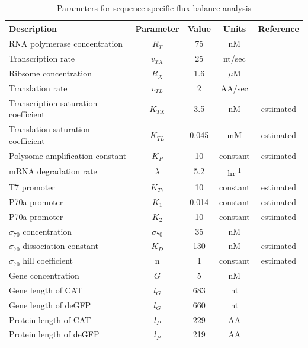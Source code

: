 \documentclass[journal=asbcd6,manuscript=article]{achemso}
\begin{document}
\begin{table}[!]
\centering
    \caption{Parameters for sequence specific flux balance analysis}
    \renewcommand{\arraystretch}{1}
    \begin{tabular}{lcccc} \toprule
        \textbf{Description} & \textbf{Parameter} & \textbf{Value} & \textbf{Units} & \textbf{Reference} \\ \toprule
        RNA polymerase concentration & $R_{T}$ & 75 & nM & \cite{Garamella:2016aa} \\
        Transcription rate & $v_{TX}$ & 25 & nt/sec & \cite{Garamella:2016aa} \\
        Ribsome concentration & $R_{X}$ & 1.6 & $\mu$M & \cite{Garamella:2016aa, 2005_underwood_biotech} \\
        Translation rate & $v_{TL}$ & 2 & AA/sec & \cite{Garamella:2016aa, 2005_underwood_biotech} \\
        Transcription saturation coefficient & $K_{TX}$ & 3.5 & nM & estimated \\
        Translation saturation coefficient & $K_{TL}$ & 0.045 & mM & estimated \\
        Polysome amplification constant & $K_{P}$ & 10 & constant & estimated \\
        mRNA degradation rate & $\lambda$ & 5.2 & hr\textsuperscript{-1} & \cite{Garamella:2016aa} \\
        T7 promoter & $K_{T7}$ & 10 & constant & estimated \\
        P70a promoter & $K_{1}$ & 0.014 & constant & estimated \\
        P70a promoter & $K_{2}$ & 10 & constant & estimated \\
        $\sigma_{70}$ concentration & $\sigma_{70}$ & 35 & nM & \cite{Garamella:2016aa} \\
        $\sigma_{70}$ dissociation constant & $K_{D}$ & 130 & nM & estimated \\
	$\sigma_{70}$ hill coefficient & n & 1 & constant & estimated \\
	Gene concentration & $G$ & 5 & nM &  \cite{Garamella:2016aa} \\
        Gene length of CAT & $l_{G}$ & 683 & nt & \cite{Kigawa1995} \\
        Gene length of deGFP & $l_{G}$ & 660 & nt & \cite{Garamella:2016aa} \\
        Protein length of CAT & $l_{P}$ & 229 & AA & \cite{Kigawa1995} \\
        Protein length of deGFP & $l_{P}$ & 219 & AA & \cite{Garamella:2016aa} \\ \bottomrule
    \end{tabular}
\label{tbl:parameters}
\end{table}
\end{document}
